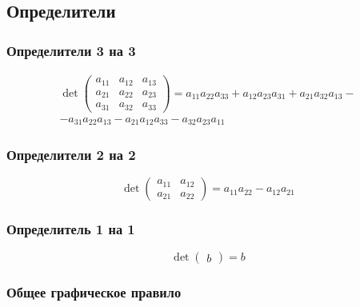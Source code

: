 \documentclass[class=article,a4paper,12pt,crop=false]{standalone}
\begin{document}
  \subsection{Определители}
  
  \subsubsection{Определители 3 на 3}

    \begin{multline}
      \det{
        \begin{pmatrix}
          a_{11} & a_{12} & a_{13} \\
          a_{21} & a_{22} & a_{23} \\
          a_{31} & a_{32} & a_{33}
        \end{pmatrix}
      }
      = a_{11}a_{22}a_{33}
      + a_{12}a_{23}a_{31}
      + a_{21}a_{32}a_{13} - \\
      - a_{31}a_{22}a_{13}
      - a_{21}a_{12}a_{33}
      - a_{32}a_{23}a_{11}
    \end{multline}

  \subsubsection{Определители 2 на 2}

  \begin{equation}
    \det{
      \begin{pmatrix}
        a_{11} &a_{12} \\
        a_{21} & a_{22}
      \end{pmatrix}
    } = a_{11}a_{22} - a_{12}a_{21}
  \end{equation}

  \subsubsection{Определитель 1 на 1}

  \begin{equation}
    \det{
      \begin{pmatrix}
        b
      \end{pmatrix}
    } = b
  \end{equation}

  \subsubsection{Общее графическое правило}
\end{document}
